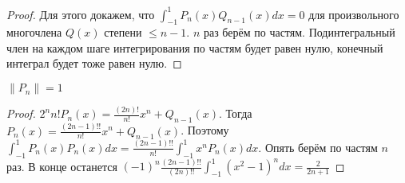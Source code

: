 \documentclass[document.tex]{subfiles}
\begin{document}
\begin{proof}
    Для этого докажем, что $\int_{-1}^{1}P_n(x) Q_{n - 1}(x)dx = 0$ для произвольного многочлена $Q(x)$ степени $\leq n
    - 1$. $n$ раз берём по частям. Подинтегральный член на каждом шаге интегрирования по частям будет равен нулю,
    конечный интеграл будет тоже равен нулю.
\end{proof}

\begin{statement}
    $\|P_n\| = 1$
\end{statement}

\begin{proof}
    $2^{n}n!P_n(x) = \frac{(2n)!}{n!}x^n + Q_{n - 1}(x)$. Тогда $P_n(x) = \frac{(2n - 1)!!}{n!}x^n + Q_{n - 1}(x)$.
    Поэтому $\int_{-1}^{1}P_n(x) P_n(x)dx = \frac{(2n - 1)!!}{n!}\int_{-1}^{1}x^nP_n(x)dx$. Опять берём по частям $n$
    раз. В конце останется $(-1)^n \frac{(2n - 1)!!}{(2n)!!}\int_{-1}^{1}(x^2 - 1)^n dx = \frac{2}{2n + 1}$
\end{proof}
\end{document}
